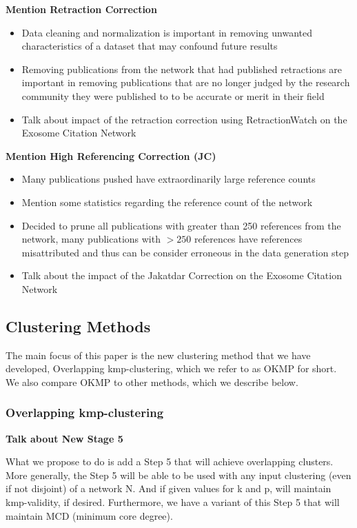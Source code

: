 \documentclass{article}
\begin{document}
\textbf{Mention Retraction Correction}
\begin{itemize}
	\item Data cleaning and normalization is important in removing unwanted characteristics of a dataset that may confound future results
	\item Removing publications from the network that had published retractions are important in removing publications that are no longer judged by the research community they were published to to be accurate or merit in their field
	\item Talk about impact of the retraction correction using RetractionWatch on the Exosome Citation Network
\end{itemize}

\textbf{Mention High Referencing Correction (JC)}
\begin{itemize}
	\item Many publications pushed have extraordinarily large reference counts
	\item Mention some statistics regarding the reference count of the network
	\item Decided to prune all publications with greater than 250 references from the network, many publications with $>250$ references have references misattributed and thus can be consider erroneous in the data generation step
	\item Talk about the impact of the Jakatdar Correction on the Exosome Citation Network 
\end{itemize}

\subsection{Clustering Methods}
The main focus of this paper is the new clustering method that we have developed, Overlapping kmp-clustering, which we refer to as OKMP for short.
We also compare OKMP to other methods, which we describe below.

\subsubsection{Overlapping kmp-clustering}

\textbf{Talk about New Stage 5}

What we propose to do is add a Step 5 that will achieve overlapping clusters. More generally, the Step 5 will be able to be used with any input clustering (even if not disjoint) of a network N. And if given values for k and p, will maintain kmp-validity, if desired. Furthermore, we have a variant of this Step 5 that will maintain MCD (minimum core degree).
\end{document}
